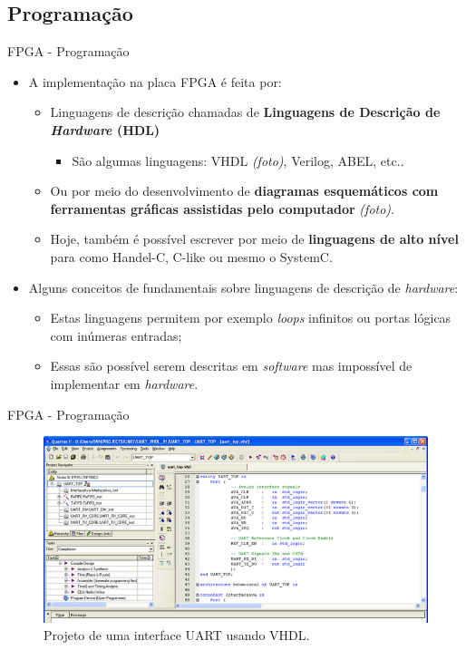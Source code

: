 \subsection{Programação}
\begin{frame}{FPGA - Programação}
	\begin{itemize}
		\setlength\itemsep{1.0em}
		\item A implementação na placa FPGA é feita por:
		\begin{itemize}
			\setlength\itemsep{0.5em}
			\item Linguagens de descrição chamadas de \textbf{Linguagens de Descrição de \textit{Hardware} (HDL)}
			\begin{itemize}
				\item São algumas linguagens: VHDL \textit{(foto)}, Verilog, ABEL, etc..
			\end{itemize}

			\item Ou por meio do desenvolvimento de \textbf{diagramas esquemáticos com ferramentas gráficas assistidas pelo computador} \textit{(foto)}.

			\item Hoje, também é possível escrever por meio de \textbf{linguagens de alto nível} para como Handel-C, C-like ou mesmo o SystemC.
		\end{itemize}

		\item Alguns conceitos de fundamentais sobre linguagens de descrição de \textit{hardware}:
		\begin{itemize}
			\setlength\itemsep{0.5em}
			\item Estas linguagens permitem por exemplo \textit{loops} infinitos ou portas lógicas com inúmeras entradas;

			\item Essas são possível serem descritas em \textit{software} mas impossível de implementar em \textit{hardware}.
		\end{itemize}
	\end{itemize}
\end{frame}

	\begin{frame}{FPGA - Programação}
		\begin{figure}[p]
			\centering
			\includegraphics[width=1\textwidth]{img/fpga/software_quartus_vhdl.png}
			\caption{Projeto de uma interface UART usando VHDL.}
			\label{fig:alteraquartus_vhdl-2}
		\end{figure}
	\end{frame}

